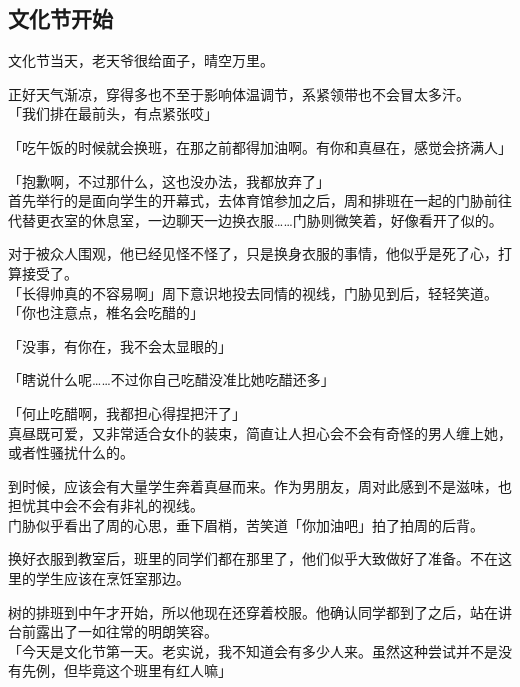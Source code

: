 \subsection{文化节开始}

文化节当天，老天爷很给面子，晴空万里。

正好天气渐凉，穿得多也不至于影响体温调节，系紧领带也不会冒太多汗。\\

「我们排在最前头，有点紧张哎」

「吃午饭的时候就会换班，在那之前都得加油啊。有你和真昼在，感觉会挤满人」

「抱歉啊，不过那什么，这也没办法，我都放弃了」\\

首先举行的是面向学生的开幕式，去体育馆参加之后，周和排班在一起的门胁前往代替更衣室的休息室，一边聊天一边换衣服……门胁则微笑着，好像看开了似的。

对于被众人围观，他已经见怪不怪了，只是换身衣服的事情，他似乎是死了心，打算接受了。\\

「长得帅真的不容易啊」周下意识地投去同情的视线，门胁见到后，轻轻笑道。\\

「你也注意点，椎名会吃醋的」

「没事，有你在，我不会太显眼的」

「瞎说什么呢……不过你自己吃醋没准比她吃醋还多」

「何止吃醋啊，我都担心得捏把汗了」\\

真昼既可爱，又非常适合女仆的装束，简直让人担心会不会有奇怪的男人缠上她，或者性骚扰什么的。

到时候，应该会有大量学生奔着真昼而来。作为男朋友，周对此感到不是滋味，也担忧其中会不会有非礼的视线。\\

门胁似乎看出了周的心思，垂下眉梢，苦笑道「你加油吧」拍了拍周的后背。\\

\vspace{2\baselineskip}

换好衣服到教室后，班里的同学们都在那里了，他们似乎大致做好了准备。不在这里的学生应该在烹饪室那边。

树的排班到中午才开始，所以他现在还穿着校服。他确认同学都到了之后，站在讲台前露出了一如往常的明朗笑容。\\

「今天是文化节第一天。老实说，我不知道会有多少人来。虽然这种尝试并不是没有先例，但毕竟这个班里有红人嘛」\\

